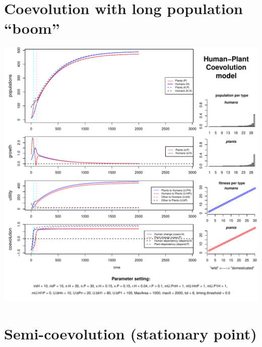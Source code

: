\documentclass[]{book}
\begin{document}
\newpage

\hypertarget{coevolution-with-long-population-boom}{%
\section{Coevolution with long population ``boom''}\label{coevolution-with-long-population-boom}}

\includegraphics{hpcModel-exploration_files/figure-latex/1_run.coevo.long.boom-plot-1.pdf}

\newpage

\hypertarget{semi-coevolution-stationary-point}{%
\section{Semi-coevolution (stationary point)}\label{semi-coevolution-stationary-point}}
\end{document}
